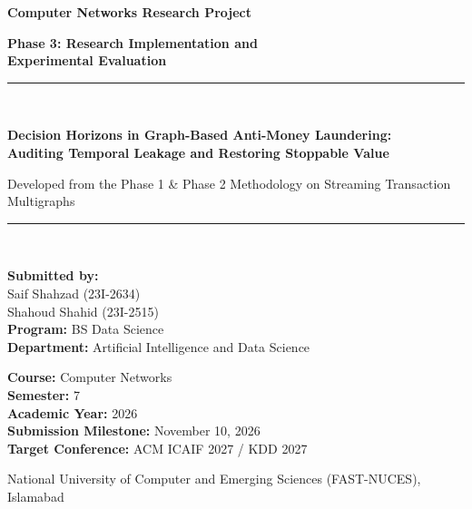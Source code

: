 \documentclass[11pt,a4paper]{article}
\begin{document}
\begin{titlepage}
    \centering
    \vspace*{1.2cm}

    {\huge\bfseries Computer Networks Research Project\par}
    \vspace{0.6cm}
    {\LARGE\bfseries Phase 3: Research Implementation and\\Experimental Evaluation\par}
    \vspace{1.0cm}

    \rule{\linewidth}{1.2pt}\\[0.4cm]
    {\Large\bfseries Decision Horizons in Graph-Based Anti-Money Laundering:\\Auditing Temporal Leakage and Restoring Stoppable Value\par}
    \vspace{0.3cm}
    {\normalsize Developed from the Phase 1 \& Phase 2 Methodology on Streaming Transaction Multigraphs\par}
    \rule{\linewidth}{1.2pt}\\[1.2cm]

    \begin{minipage}{0.48\textwidth}
        \begin{flushleft} \large
            \textbf{Submitted by:}\\[0.2cm]
            Saif Shahzad (23I-2634)\\
            Shahoud Shahid (23I-2515)\\[0.4cm]
            \textbf{Program:} BS Data Science\\
            \textbf{Department:} Artificial Intelligence and Data Science
        \end{flushleft}
    \end{minipage}
    \hfill
    \begin{minipage}{0.48\textwidth}
        \begin{flushright} \large
            \textbf{Course:} Computer Networks\\
            \textbf{Semester:} 7\\
            \textbf{Academic Year:} 2026\\
            \textbf{Submission Milestone:} November 10, 2026\\
            \textbf{Target Conference:} ACM ICAIF 2027 / KDD 2027
        \end{flushright}
    \end{minipage}

    \vfill
    {\large National University of Computer and Emerging Sciences (FAST-NUCES), Islamabad\par}
    \vspace*{0.8cm}
\end{titlepage}
\end{document}
